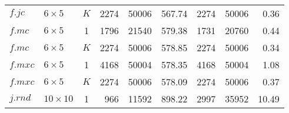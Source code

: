 \begin{table}[t!]
\begin{minipage}{\textwidth}
\begin{tabular}{llcrrrrrr}
    $f.jc$ & $6\times5$ & $K$ & 2274 & 50006 & 567.74 & 2274 & 50006 & 0.36 \\ 
    $f.mc$ & $6\times5$ & 1 & 1796 & 21540 & 579.38 & 1731 & 20760 & 0.44 \\ 
    $f.mc$ & $6\times5$ & $K$ & 2274 & 50006 & 578.85 & 2274 & 50006 & 0.34 \\ 
    $f.mxc$ & $6\times5$ & 1 & 4168 & 50004 & 578.35 & 4168 & 50004 & 1.08 \\ 
    $f.mxc$ & $6\times5$ & $K$ & 2274 & 50006 & 578.09 & 2274 & 50006 & 0.37 \\ 
    \midrule
    $j.rnd$ & $10\times10$ & 1 & 966 & 11592 & 898.22 & 2997 & 35952 & 10.49 \\ 
    \bottomrule 
\end{tabular} \vspace{-3pt}
\end{minipage}
\end{table}
